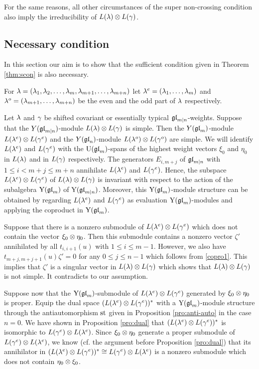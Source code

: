 \documentclass[12pt]{amsart}
\begin{document}
For the same reasons, all other circumstances of the super non-crossing condition also imply the irreducibility of $L(\lambda)\otimes L(\gamma)$.
\epf

\subsection{Necessary condition}
In this section our aim is to show that the sufficient condition given in Theorem \ref{thm:scon} is also necessary.

For $\lambda=(\lambda_1,\lambda_2,\ldots,\lambda_m,\lambda_{m+1},\ldots,\lambda_{m+n})$ let $\lambda^e=(\lambda_1,\ldots,\lambda_m)$ and $\lambda^o=(\lambda_{m+1},\ldots,\lambda_{m+n})$ be the even and the odd part of $\lambda$ respectively.

\ble
Let $\lambda$ and $\gamma$ be shifted covariant or essentially typical $\mathfrak{gl}_{m|n}$-weights. Suppose that the $Y(\mathfrak{gl}_{m|n})$-module $L(\lambda)\otimes L(\gamma)$  is simple. Then the $Y(\mathfrak{gl}_{m})$-module  $L(\lambda^e)\otimes L(\gamma^e)$ and the $Y(\mathfrak{gl}_{n})$-module
  $L(\lambda^o)\otimes L(\gamma^o)$ are simple.
\ele
\bpf
We will identify $L(\lambda^e)$ and $L(\gamma^e)$ with the ${\rm U}(\mathfrak{gl}_m)$-spans of the highest weight vectors $\xi_0$  and $\eta_0$ in  $L(\lambda)$ and in $L(\gamma)$ respectively.
The generators $E_{i,m+j}$ of $\mathfrak{gl}_{m|n}$ with $1\leq i< m+j\leq m+n$ annihilate $L(\lambda^e)$ and $L(\gamma^e)$.
Hence, the subspace $L(\lambda^e)\otimes L(\gamma^e)$ of $L(\lambda)\otimes L(\gamma)$ is invariant with respect to the action of the subalgebra ${\rm Y}(\mathfrak{gl}_m)$ of ${\rm Y}(\mathfrak{gl}_{m|n})$.
Moreover, this  ${\rm Y}(\mathfrak{gl}_m)$-module structure can be obtained by regarding $L(\lambda^e)$ and $L(\gamma^e)$ as evaluation ${\rm Y}(\mathfrak{gl}_m)$-modules  and applying the coproduct in ${\rm Y}(\mathfrak{gl}_m)$.

Suppose that there is a nonzero submodule of $L(\lambda^e)\otimes L(\gamma^e)$ which does not contain the vector $\xi_0\otimes \eta_0$.
Then this submodule contains a nonzero vector $\zeta'$ annihilated by all $t_{i,i+1}(u)$ with $1\leq i\leq m-1$. However, we also have $t_{m+j,m+j+1}(u)\zeta'=0$ for any $0\leq j\leq n-1$ which follows from \eqref{copro1}.
This implies that $\zeta'$ is  a singular vector in $L(\lambda)\otimes L(\gamma)$ which shows that $L(\lambda)\otimes L(\gamma)$ is not simple. It contradicts to our assumption.

Suppose now that the ${\rm Y}(\mathfrak{gl}_m)$-submodule of $L(\lambda^e)\otimes L(\gamma^e)$ generated by $\xi_0\otimes \eta_0$ is proper.
Equip the dual space $(L(\lambda^e)\otimes L(\gamma^e))^*$ with a ${\rm Y}(\mathfrak{gl}_m)$-module structure through the antiautomorphism ${\rm st}$ given in Proposition \ref{pro:anti-auto} in the case $n=0$.
We have shown  in Proposition \ref{pro:dual} that $(L(\lambda^e)\otimes L(\gamma^e))^*$ is isomorphic to $L(\gamma^e)\otimes L(\lambda^e)$.
Since $\xi_0\otimes \eta_0$ generate a proper submodule of $L(\gamma^e)\otimes L(\lambda^e)$, we know (cf. the argument before Proposition \ref{pro:dual}) that its annihilator in $(L(\lambda^e)\otimes L(\gamma^e))^*\cong L(\gamma^e)\otimes L(\lambda^e)$ is  a nonzero submodule which does not contain $\eta_0\otimes \xi_0$.
\end{document}
